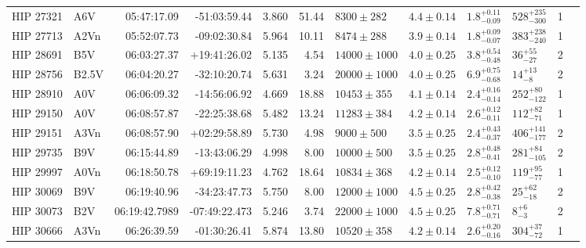 \begin{tiny}
\begin{longtable}{|l|lrrrrllllll|}
   HIP 27321 &      A6V &    05:47:17.09 &   -51:03:59.44 &   3.860 &     51.44 &    $8300 \pm 282$ &  $4.4 \pm 0.14$ &  $1.8^{+0.11}_{-0.09}$ &   $528^{+235}_{-300}$ &       1 \\
   HIP 27713 &     A2Vn &    05:52:07.73 &   -09:02:30.84 &   5.964 &     10.11 &    $8474 \pm 288$ &  $3.9 \pm 0.14$ &  $1.8^{+0.09}_{-0.07}$ &   $383^{+238}_{-240}$ &       1 \\
   HIP 28691 &      B5V &    06:03:27.37 &   +19:41:26.02 &   5.135 &      4.54 &  $14000 \pm 1000$ &  $4.0 \pm 0.25$ &  $3.8^{+0.54}_{-0.48}$ &      $36^{+55}_{-27}$ &       2 \\
   HIP 28756 &    B2.5V &    06:04:20.27 &   -32:10:20.74 &   5.631 &      3.24 &  $20000 \pm 1000$ &  $4.0 \pm 0.25$ &  $6.9^{+0.75}_{-0.68}$ &       $14^{+13}_{-8}$ &       2 \\
   HIP 28910 &      A0V &    06:06:09.32 &   -14:56:06.92 &   4.669 &     18.88 &   $10453 \pm 355$ &  $4.1 \pm 0.14$ &  $2.4^{+0.16}_{-0.14}$ &    $252^{+80}_{-122}$ &       1 \\
   HIP 29150 &      A0V &    06:08:57.87 &   -22:25:38.68 &   5.482 &     13.24 &   $11283 \pm 384$ &  $4.2 \pm 0.14$ &  $2.6^{+0.12}_{-0.11}$ &     $112^{+82}_{-71}$ &       1 \\
   HIP 29151 &     A3Vn &    06:08:57.90 &   +02:29:58.89 &   5.730 &      4.98 &    $9000 \pm 500$ &  $3.5 \pm 0.25$ &  $2.4^{+0.43}_{-0.37}$ &   $406^{+141}_{-177}$ &       2 \\
   HIP 29735 &      B9V &    06:15:44.89 &   -13:43:06.29 &   4.998 &      8.00 &   $10000 \pm 500$ &  $3.5 \pm 0.25$ &  $2.8^{+0.48}_{-0.41}$ &    $281^{+84}_{-105}$ &       2 \\
   HIP 29997 &     A0Vn &    06:18:50.78 &   +69:19:11.23 &   4.762 &     18.64 &   $10834 \pm 368$ &  $4.2 \pm 0.14$ &  $2.5^{+0.12}_{-0.10}$ &     $119^{+95}_{-77}$ &       1 \\
   HIP 30069 &      B9V &    06:19:40.96 &   -34:23:47.73 &   5.750 &      8.00 &  $12000 \pm 1000$ &  $4.5 \pm 0.25$ &  $2.8^{+0.42}_{-0.38}$ &      $25^{+62}_{-18}$ &       2 \\
   HIP 30073 &     B2V  &  06:19:42.7989 &  -07:49:22.473 &   5.246 &      3.74 &  $22000 \pm 1000$ &  $4.5 \pm 0.25$ &  $7.8^{+0.71}_{-0.71}$ &         $8^{+6}_{-3}$ &       2 \\
   HIP 30666 &     A3Vn &    06:26:39.59 &   -01:30:26.41 &   5.874 &     13.80 &   $10520 \pm 358$ &  $4.2 \pm 0.14$ &  $2.6^{+0.20}_{-0.16}$ &     $304^{+37}_{-72}$ &       1 \\

\end{longtable}
\end{tiny}
